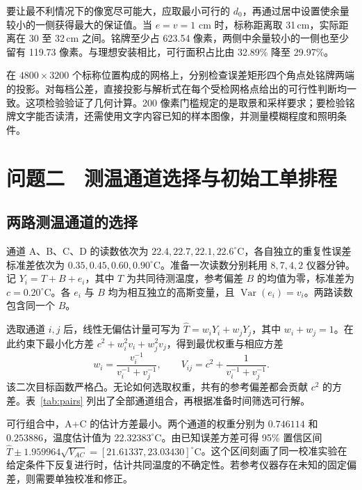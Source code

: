\begin{table}[H]\centering
\caption{轴向与横向公差相等时，最优居中设置下可保证的成像指标。面积占比均以原始 \(1.08\,\mathrm{m}^2\) 参数矩形为分母。}
\ToleranceTable
\end{table}
要让最不利情况下的像宽尽可能大，应取最小可行的 \(d_0\)，再通过居中设置使余量较小的一侧获得最大的保证值。当 \(e=v=1\) cm 时，标称距离取 31\,cm，实际距离在 30 至 32\,cm 之间。铭牌至少占 623.54 像素，两侧中余量较小的一侧也至少留有 119.73 像素。与理想安装相比，可行面积占比由 32.89\% 降至 29.97\%。

在 \(4800\times3200\) 个标称位置构成的网格上，分别检查误差矩形四个角点处铭牌两端的投影。对每档公差，直接投影与解析式在每个受检网格点给出的可行性判断均一致。这项检验验证了几何计算。200 像素门槛规定的是取景和采样要求；要检验铭牌文字能否读清，还需使用文字内容已知的样本图像，并测量模糊程度和照明条件。

\clearpage
\section{问题二　测温通道选择与初始工单排程}
\subsection{两路测温通道的选择}
通道 A、B、C、D 的读数依次为 \(22.4,22.7,22.1,22.6^\circ\mathrm C\)，各自独立的重复性误差标准差依次为 \(0.35,0.45,0.60,0.90^\circ\mathrm C\)。准备一次读数分别耗用 \(8,7,4,2\) 仪器分钟。记 \(Y_i=T+B+e_i\)，其中 \(T\) 为共同待测温度，参考偏差 \(B\) 的均值为零，标准差为 \(c=0.20^\circ\mathrm C\)。各 \(e_i\) 与 \(B\) 均为相互独立的高斯变量，且 \(\operatorname{Var}(e_i)=v_i\)。两路读数包含同一个 \(B\)。

选取通道 \(i,j\) 后，线性无偏估计量可写为 \(\hat T=w_iY_i+w_jY_j\)，其中 \(w_i+w_j=1\)。在此约束下最小化方差 \(c^2+w_i^2v_i+w_j^2v_j\)，得到最优权重与相应方差
\begin{equation}
 w_i=\frac{v_i^{-1}}{v_i^{-1}+v_j^{-1}},\qquad
 V_{ij}=c^2+\frac{1}{v_i^{-1}+v_j^{-1}} .
\end{equation}
该二次目标函数严格凸。无论如何选取权重，共有的参考偏差都会贡献 \(c^2\) 的方差。表~\ref{tab:pairs} 列出了全部通道组合，再根据准备时间筛选可行解。

\begin{table}[H]\centering
\caption{准备预算为 12 仪器分钟时的通道组合比较。}\label{tab:pairs}
\PairTable
\end{table}

可行组合中，A+C 的估计方差最小。两个通道的权重分别为 \(0.746114\) 和 \(0.253886\)，温度估计值为 \(22.32383^\circ\mathrm C\)。由已知误差方差可得 95\% 置信区间 \(\hat T\pm1.959964\sqrt{V_{AC}}=[21.61337,23.03430]^\circ\mathrm C\)。这个区间刻画了同一校准实验在给定条件下反复进行时，估计共同温度的不确定性。若参考仪器存在未知的固定偏差，则需要单独校准和修正。

